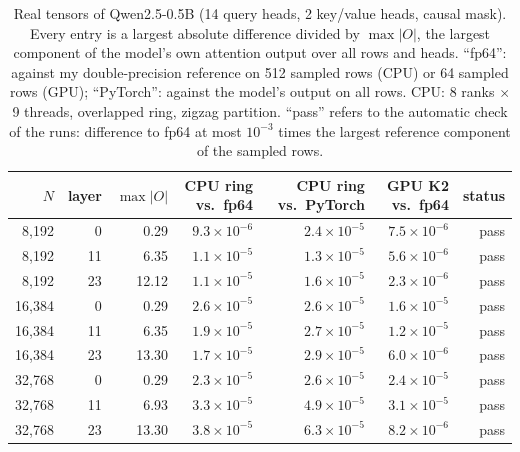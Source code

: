 \begin{table}[t]\centering\small
\begin{tabular}{@{}rrrrrrr@{}}
\toprule
$N$ & layer & $\max|O|$ & CPU ring vs.\ fp64 & CPU ring vs.\ PyTorch & GPU K2 vs.\ fp64 & status\\
\midrule
8{,}192 & 0 & 0.29 & $9.3\times10^{-6}$ & $2.4\times10^{-5}$ & $7.5\times10^{-6}$ & pass\\
8{,}192 & 11 & 6.35 & $1.1\times10^{-5}$ & $1.3\times10^{-5}$ & $5.6\times10^{-6}$ & pass\\
8{,}192 & 23 & 12.12 & $1.1\times10^{-5}$ & $1.6\times10^{-5}$ & $2.3\times10^{-6}$ & pass\\
16{,}384 & 0 & 0.29 & $2.6\times10^{-5}$ & $2.6\times10^{-5}$ & $1.6\times10^{-5}$ & pass\\
16{,}384 & 11 & 6.35 & $1.9\times10^{-5}$ & $2.7\times10^{-5}$ & $1.2\times10^{-5}$ & pass\\
16{,}384 & 23 & 13.30 & $1.7\times10^{-5}$ & $2.9\times10^{-5}$ & $6.0\times10^{-6}$ & pass\\
32{,}768 & 0 & 0.29 & $2.3\times10^{-5}$ & $2.6\times10^{-5}$ & $2.4\times10^{-5}$ & pass\\
32{,}768 & 11 & 6.93 & $3.3\times10^{-5}$ & $4.9\times10^{-5}$ & $3.1\times10^{-5}$ & pass\\
32{,}768 & 23 & 13.30 & $3.8\times10^{-5}$ & $6.3\times10^{-5}$ & $8.2\times10^{-6}$ & pass\\
\bottomrule
\end{tabular}
\caption{Real tensors of Qwen2.5-0.5B (14 query heads, 2 key/value heads, causal mask). Every entry is a largest absolute difference divided by $\max|O|$, the largest component of the model's own attention output over all rows and heads. ``fp64'': against my double-precision reference on 512 sampled rows (CPU) or 64 sampled rows (GPU); ``PyTorch'': against the model's output on all rows. CPU: 8 ranks $\times$ 9 threads, overlapped ring, zigzag partition. ``pass'' refers to the automatic check of the runs: difference to fp64 at most $10^{-3}$ times the largest reference component of the sampled rows.}
\label{tab:v7}
\end{table}
